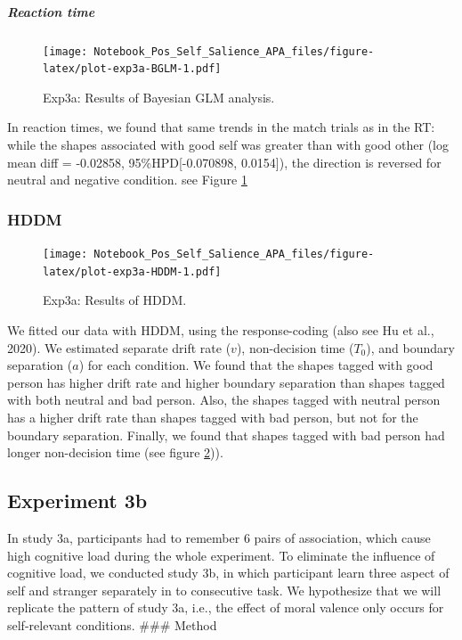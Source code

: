 \documentclass[
  english,
  man]{apa6}
\let\oldsubparagraph\subparagraph
\renewcommand{\subparagraph}[1]{\oldsubparagraph{#1}\mbox{}}
\begin{document}
\hypertarget{reaction-time-5}{%
\subparagraph{Reaction time}\label{reaction-time-5}}

\begin{figure}
\centering
\texttt{[image: Notebook\_Pos\_Self\_Salience\_APA\_files/figure-latex/plot-exp3a-BGLM-1.pdf]}
\caption{\label{fig:plot-exp3a-BGLM}Exp3a: Results of Bayesian GLM analysis.}
\end{figure}

In reaction times, we found that same trends in the match trials as in the RT: while the shapes associated with good self was greater than with good other (log mean diff = -0.02858, 95\%HPD{[}-0.070898, 0.0154{]}), the direction is reversed for neutral and negative condition. see Figure \ref{fig:plot-exp3a-BGLM}

\hypertarget{hddm-5}{%
\subsubsection{HDDM}\label{hddm-5}}

\begin{figure}
\centering
\texttt{[image: Notebook\_Pos\_Self\_Salience\_APA\_files/figure-latex/plot-exp3a-HDDM-1.pdf]}
\caption{\label{fig:plot-exp3a-HDDM}Exp3a: Results of HDDM.}
\end{figure}

We fitted our data with HDDM, using the response-coding (also see Hu et al., 2020). We estimated separate drift rate (\(v\)), non-decision time (\(T_{0}\)), and boundary separation (\(a\)) for each condition. We found that the shapes tagged with good person has higher drift rate and higher boundary separation than shapes tagged with both neutral and bad person. Also, the shapes tagged with neutral person has a higher drift rate than shapes tagged with bad person, but not for the boundary separation. Finally, we found that shapes tagged with bad person had longer non-decision time (see figure \ref{fig:plot-exp3a-HDDM})).

\hypertarget{experiment-3b}{%
\subsection{Experiment 3b}\label{experiment-3b}}

In study 3a, participants had to remember 6 pairs of association, which cause high cognitive load during the whole experiment. To eliminate the influence of cognitive load, we conducted study 3b, in which participant learn three aspect of self and stranger separately in to consecutive task. We hypothesize that we will replicate the pattern of study 3a, i.e., the effect of moral valence only occurs for self-relevant conditions.
\#\#\# Method
\end{document}
